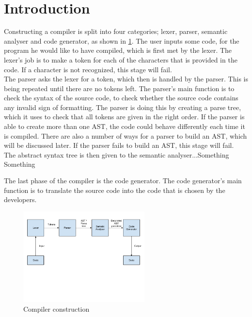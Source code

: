 \section*{Introduction}
Constructing a compiler is split into four categories; lexer, parser, semantic analyser and code generator, as shown in \ref{fig:Compilerconstruction}.
The user inputs some code, for the program he would like to have compiled, which is first met by the lexer. The lexer's job is to make a token for each of the characters that is provided in the code. If a character is not recognized, this stage will fail. \\


The parser asks the lexer for a token, which then is handled by the parser. This is being repeated until there are no tokens left. The parser's main function is to check the syntax of the source code, to check whether the source code contains any invalid sign of formatting. The parser is doing this by creating a parse tree, which it uses to check that all tokens are given in the right order. If the parser is able to create more than one AST, the code could behave differently each time it is compiled. There are also a number of ways for a parser to build an AST, which will be discussed later. If the parser fails to build an AST, this stage will fail. \\

The abstract syntax tree is then given to the semantic analyser...Something Something

The last phase of the compiler is the code generator. The code generator's main function is to translate the source code into the code that is chosen by the developers.


\begin{figure}[! h]
\centering
	 \includegraphics[width=250px]{images/Compilerconstruction.png}
		 \caption{Compiler construction}
	\label{fig:Compilerconstruction}
\end{figure}
